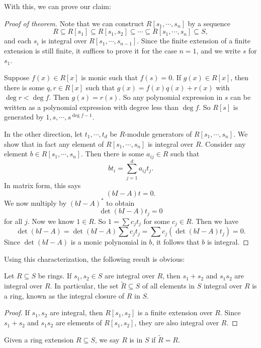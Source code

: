 \documentclass[a4paper]{article}
\begin{document}
With this, we can prove our claim:
\begin{proof}[Proof of theorem]
  Note that we can construct $R[s_1, \cdots, s_n]$ by a sequence
  \[
    R \subseteq R[s_1] \subseteq R[s_1, s_2] \subseteq \cdots \subseteq R[s_1, \cdots, s_n] \subseteq S,
  \]
  and each $s_i$ is integral over $R[s_1, \cdots, s_{n - 1}]$. Since the finite extension of a finite extension is still finite, it suffices to prove it for the case $n = 1$, and we write $s$ for $s_1$.

  Suppose $f(x) \in R[x]$ is monic such that $f(s) = 0$. If $g(x) \in R[x]$, then there is some $q, r \in R[x]$ such that $g(x) = f(x)q(x) + r(x)$ with $\deg r < \deg f$. Then $g(s) = r(s)$. So any polynomial expression in $s$ can be written as a polynomial expression with degree less than $\deg f$. So $R[s]$ is generated by $1, s, \cdots, s^{\deg f - 1}$.

  In the other direction, let $t_1, \cdots, t_d$ be $R$-module generators of $R[s_1, \cdots, s_n]$. We show that in fact any element of $R[s_1, \cdots, s_n]$ is integral over $R$. Consider any element $b \in R[s_1, \cdots, s_n]$. Then there is some $a_{ij} \in R$ such that
  \[
    b t_i = \sum_{j = 1}^d a_{ij} t_j.
  \]
  In matrix form, this says
  \[
    (bI - A)t = 0.
  \]
  We now multiply by $(bI - A)^*$ to obtain
  \[
    \det(bI - A) t_j = 0
  \]
  for all $j$. Now we know $1 \in R$. So $1 = \sum c_j t_j$ for some $c_j \in R$. Then we have
  \[
    \det(bI - A) = \det(bI - A) \sum c_j t_j = \sum c_j (\det (bI - A) t_j) = 0.
  \]
  Since $\det(bI - A)$ is a monic polynomial in $b$, it follows that $b$ is integral.
\end{proof}

Using this characterization, the following result is obvious:
\begin{cor}
  Let $R \subseteq S$ be rings. If $s_1, s_2 \in S$ are integral over $R$, then $s_1 + s_2$ and $s_1s_2$ are integral over $R$. In particular, the set $\tilde{R} \subseteq S$ of all elements in $S$ integral over $R$ is a ring, known as the integral closure of $R$ in $S$.
\end{cor}

\begin{proof}
  If $s_1, s_2$ are integral, then $R[s_1, s_2]$ is a finite extension over $R$. Since $s_1 + s_2$ and $s_1s_2$ are elements of $R[s_1, s_2]$, they are also integral over $R$.
\end{proof}

\begin{defi}
  Given a ring extension $R \subseteq S$, we say $R$ is  in $S$ if $\tilde{R} = R$.
\end{defi}
\end{document}
